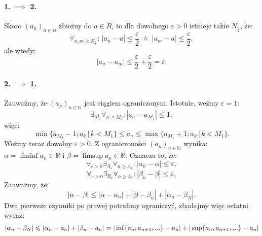 \documentclass{article}
\numberwithin{defi}{section}
\numberwithin{defi}{section}
\newcommand{\R}{\mathbb{R}}
\newcommand{\N}{\mathbb{N}}
\renewcommand{\inf}{\mathop{\mathrm{inf}\vphantom{\mathrm{sup}}}}
\providecommand{\eps}{\varepsilon}
\newcommand{\ciag}[1]{(#1_{n})_{n \in \N}}
\begin{document}
\begin{dow}
    \paragraph*{1. $\implies$ 2.} Skoro $\ciag{a}$ zbieżny do $a \in R$, to dla dowolnego $\eps >0$ istnieje takie $N_{\frac{\eps}{2}}$, że: \begin{equation}
        \forall_{n, m \geqslant N_{\frac{\eps}{2}}}: \,|a_n - a| \leqslant \frac{\eps}{2} \,\, \land\,\, |a_m - a| \leqslant \frac{\eps}{2},
    \end{equation}
    ale wtedy: \begin{equation}
        |a_n - a_m| \leqslant \frac{\eps}{2} + \frac{\eps}{2} = \eps.
    \end{equation}

    \paragraph*{2. $\implies$ 1.} Zauważmy, że $\ciag{a}$ jest ciągiem ograniczonym. Istotnie, weźmy $\eps = 1$: \begin{equation}
        \exists_{M_1} \forall_{n \geqslant M_1}: |a_n - a_{M_1}| \leqslant 1,
    \end{equation} więc: \begin{equation}
        \min \{ a_{M_1} -1; a_k \, \big| \, k < M_1 \} \leqslant a_n \leqslant \max \{ a_{M_1} +1; a_k \, \big| \, k < M_1 \}.
    \end{equation}
    Weźmy teraz dowolny $\eps > 0$. Z ograniczoności $\ciag{a}$ wynika: $\alpha = \liminf a_n \in \R$ i $\beta = \limsup a_n \in \R$. Oznacza to, że: \begin{equation}
        \forall_{\eps > 0} \exists_{A_\eps} \forall_{n \geqslant A_\eps}: |\alpha_n - \alpha| \leqslant \eps,
    \end{equation} \begin{equation}
        \forall_{\eps > 0} \exists_{B_\eps} \forall_{n \geqslant B_\eps}: |\beta_n - \beta| \leqslant \eps,
    \end{equation}
    Zauważmy, że: \begin{equation}
        |\alpha - \beta| \leqslant |\alpha - \alpha_n| + |\beta - \beta_n| + |\alpha_n - \beta_N|.
    \end{equation}
    Dwa pierwsze czynniki po prawej potrafimy ograniczyć, zbadajmy więc ostatni wyraz: \begin{equation} \begin{split}
            |\alpha_n - \beta_N| \leqslant |\alpha_n - a_n| + |\beta_n - a_n| & = |\inf\{a_n, a_{n+1}, ...\} - a_n| + |\sup\{a_n, a_{n+1}, ...\} - a_n| \\

\end{split}
\end{equation}
\end{dow}
\end{document}
